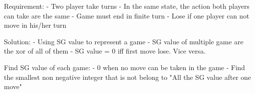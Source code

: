 Requirement:
- Two player take turns
- In the same state, the action both players can take are the same
- Game must end in finite turn
- Lose if one player can not move in his/her turn

Solution:
- Using SG value to represent a game
- SG value of multiple game are the xor of all of them
- SG value = 0 iff first move lose. Vice versa.

Find SG value of each game:
- 0 when no move can be taken in the game
- Find the smallest non negative integer that is not belong to
    "All the SG value after one move"
